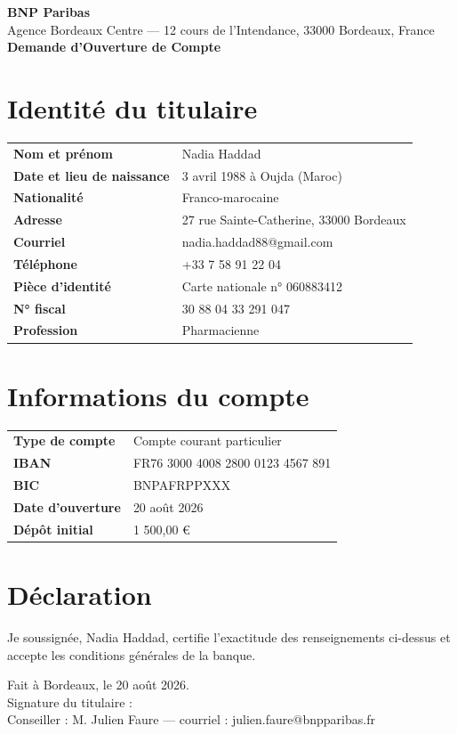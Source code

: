 \documentclass[11pt,a4paper]{article}
\begin{document}
{\Huge\bfseries\color{accent} BNP Paribas}\\[0.2em]
{\normalsize Agence Bordeaux Centre — 12 cours de l'Intendance, 33000 Bordeaux, France}\\[0.8em]
{\LARGE\bfseries Demande d'Ouverture de Compte}

\section{Identité du titulaire}
\begin{tabularx}{\linewidth}{@{}>{\bfseries}l X@{}}
Nom et prénom & Nadia Haddad \\
Date et lieu de naissance & 3 avril 1988 à Oujda (Maroc) \\
Nationalité & Franco-marocaine \\
Adresse & 27 rue Sainte-Catherine, 33000 Bordeaux \\
Courriel & nadia.haddad88@gmail.com \\
Téléphone & +33 7 58 91 22 04 \\
Pièce d'identité & Carte nationale n° 060883412 \\
N° fiscal & 30 88 04 33 291 047 \\
Profession & Pharmacienne \\
\end{tabularx}

\section{Informations du compte}
\begin{tabularx}{\linewidth}{@{}>{\bfseries}l X@{}}
Type de compte & Compte courant particulier \\
IBAN & FR76 3000 4008 2800 0123 4567 891 \\
BIC & BNPAFRPPXXX \\
Date d'ouverture & 20 août 2026 \\
Dépôt initial & 1 500,00 € \\
\end{tabularx}

\section{Déclaration}
Je soussignée, Nadia Haddad, certifie l'exactitude des renseignements ci-dessus
et accepte les conditions générales de la banque.

\vspace{1.5em}
Fait à Bordeaux, le 20 août 2026.\\[1.2em]
Signature du titulaire : \underline{\hspace{5cm}}\\[0.6em]
Conseiller : M. Julien Faure — courriel : julien.faure@bnpparibas.fr
\end{document}
